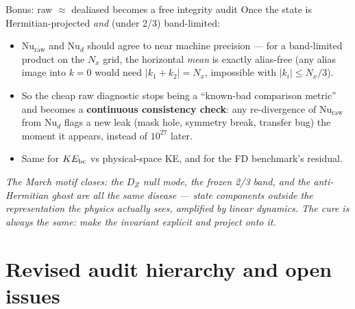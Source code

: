 \documentclass[aspectratio=169,10pt]{beamer}
\newcommand{\Nud}{\mathrm{Nu}_{d}}
\newcommand{\Nuraw}{\mathrm{Nu}_{\mathrm{raw}}}
\begin{document}
\begin{frame}{Bonus: raw $\approx$ dealiased becomes a free integrity audit}
  Once the state is Hermitian-projected \emph{and} (under 2/3) band-limited:
  \begin{itemize}
    \item $\Nuraw$ and $\Nud$ should agree to near machine precision --- for a
      band-limited product on the $N_x$ grid, the horizontal \emph{mean} is exactly
      alias-free (any alias image into $k{=}0$ would need $|k_1+k_2| = N_x$,
      impossible with $|k_i|\le N_x/3$).
    \item So the cheap raw diagnostic stops being a ``known-bad comparison metric''
      and becomes a \textbf{continuous consistency check}: any re-divergence of
      $\Nuraw$ from $\Nud$ flags a new leak (mask hole, symmetry break, transfer bug)
      the moment it appears, instead of $10^{27}$ later.
    \item Same for $KE_{\rm bc}$ vs physical-space KE, and for the FD benchmark's
      residual.
  \end{itemize}
  \medskip
  \emph{The March motif closes: the $D_Z$ null mode, the frozen 2/3 band, and the
  anti-Hermitian ghost are all the same disease --- state components outside the
  representation the physics actually sees, amplified by linear dynamics. The cure
  is always the same: make the invariant explicit and project onto it.}
\end{frame}

\section{Revised audit hierarchy and open issues}
\end{document}
